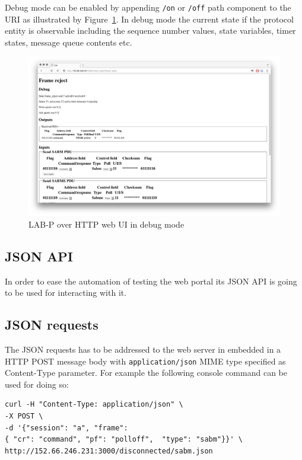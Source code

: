 \documentclass[a4paper]{article}
\begin{document}
Debug mode can be enabled by appending \verb!/on! or \verb!/off! path component to the
URI as illustrated by Figure~\ref{fig:web2}. In debug mode the current state if the protocol entity is observable
including the sequence number values, state variables, timer states, message queue contents etc.

\begin{figure}[!htb]
    \centering
    \includegraphics[width=\textwidth]{figures/web2.png}
    \caption{LAB-P over HTTP web UI in debug mode}
    \label{fig:web2}
\end{figure}

\subsection{JSON API}
In order to ease the automation of testing the web portal its JSON API is going to be used for interacting with it.

\subsection{JSON requests}\label{sec:json_req}

The JSON requests has to be addressed to the web server in embedded in a HTTP POST message body with
\verb!application/json! MIME type specified as Content-Type parameter. For example the following console command
can be used for doing so:

\begin{verbatim}
curl -H "Content-Type: application/json" \
-X POST \
-d '{"session": "a", "frame": 
{ "cr": "command", "pf": "polloff",  "type": "sabm"}}' \
http://152.66.246.231:3000/disconnected/sabm.json
\end{verbatim}
\end{document}
